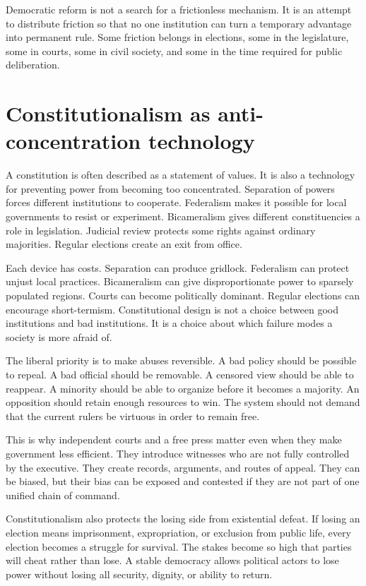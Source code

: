 ﻿\documentclass[12pt,a4paper]{book}
\begin{document}
Democratic reform is not a search for a frictionless mechanism.  It is an
attempt to distribute friction so that no one institution can turn a
temporary advantage into permanent rule.  Some friction belongs in elections,
some in the legislature, some in courts, some in civil society, and some in
the time required for public deliberation.

\section{Constitutionalism as anti-concentration technology}

A constitution is often described as a statement of values.  It is also a
technology for preventing power from becoming too concentrated.  Separation
of powers forces different institutions to cooperate.  Federalism makes it
possible for local governments to resist or experiment.  Bicameralism gives
different constituencies a role in legislation.  Judicial review protects
some rights against ordinary majorities.  Regular elections create an exit
from office.

Each device has costs.  Separation can produce gridlock.  Federalism can
protect unjust local practices.  Bicameralism can give disproportionate power
to sparsely populated regions.  Courts can become politically dominant.
Regular elections can encourage short-termism.  Constitutional design is
not a choice between good institutions and bad institutions.  It is a choice
about which failure modes a society is more afraid of.

The liberal priority is to make abuses reversible.  A bad policy should be
possible to repeal.  A bad official should be removable.  A censored view
should be able to reappear.  A minority should be able to organize before it
becomes a majority.  An opposition should retain enough resources to win.
The system should not demand that the current rulers be virtuous in order to
remain free.

This is why independent courts and a free press matter even when they make
government less efficient.  They introduce witnesses who are not fully
controlled by the executive.  They create records, arguments, and routes of
appeal.  They can be biased, but their bias can be exposed and contested if
they are not part of one unified chain of command.

Constitutionalism also protects the losing side from existential defeat.  If
losing an election means imprisonment, expropriation, or exclusion from
public life, every election becomes a struggle for survival.  The stakes
become so high that parties will cheat rather than lose.  A stable democracy
allows political actors to lose power without losing all security, dignity,
or ability to return.
\end{document}
